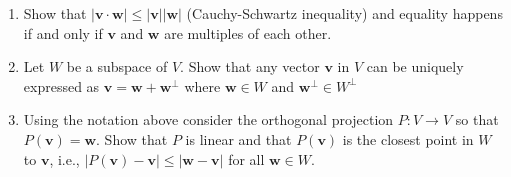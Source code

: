 \documentclass[11pt]{article}
\theoremstyle{definition}
\newenvironment{customex}[1]
  {\renewcommand\theinnercustomex{#1}\innercustomex}
  {\endinnercustomex}
\newcommand{\vv}{\mathbf{v}}
\newcommand{\vw}{\mathbf{w}}
\begin{document}
    \begin{customex}{\textbf{5}}
        \begin{enumerate}[label = \alph*)]
            \item Show that $|\vv\cdot \vw| \le |\vv||\vw|$ (Cauchy-Schwartz inequality) and equality happens if and only if $\vv$ and $\vw$ are multiples of each other.
            \item Let $W$ be a subspace of $V$. Show that any vector $\vv$ in $V$ can be uniquely expressed as $\vv = \vw + \vw^{\perp}$ where $\vw \in W$ and $\vw^{\perp} \in W^{\perp}$
            \item Using the notation above consider the orthogonal projection $P : V \to V$ so that $P(\vv) = \vw$. Show that
            $P$ is linear and that $P(\vv)$ is the closest point in $W$ to $\vv$, i.e.,
            $|P(\vv) - \vv| \le |\vw - \vv|$ for all $\vw \in W$.
        \end{enumerate}
    \end{customex}
\end{document}
